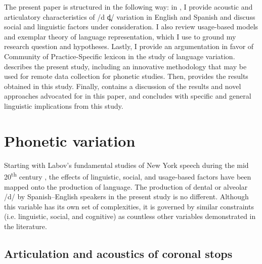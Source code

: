 \documentclass[output=paper,colorlinks,citecolor=brown,
]{langscibook}
\begin{document}
The present paper is structured in the following way: in , I provide acoustic and articulatory characteristics of /d d̪/ variation in English and Spanish and discuss social and linguistic factors under consideration. I also review usage-based models and exemplar theory of language representation, which I use to ground my research question and hypotheses. Lastly, I provide an argumentation in favor of Community of Practice-Specific lexicon in the study of language variation.  describes the present study, including an innovative methodology that may be used for remote data collection for phonetic studies. Then,  provides the results obtained in this study. Finally,  contains a discussion of the results and novel approaches advocated for in this paper, and  concludes with specific and general linguistic implications from this study.

\section{Phonetic variation}\label{sec:gutierrez:lit}

Starting with Labov's fundamental studies of New York speech during the mid 20\textsuperscript{th} century \citep{labov1963social,labov1966social}, the effects of linguistic, social, and usage-based factors have been mapped onto the production of language. The production of dental or alveolar /d/ by Spanish--English speakers in the present study is no different. Although this variable has its own set of complexities, it is governed by similar constraints (i.e. linguistic, social, and cognitive) as countless other variables demonstrated in the literature.

\subsection{Articulation and acoustics of coronal stops}
\end{document}
